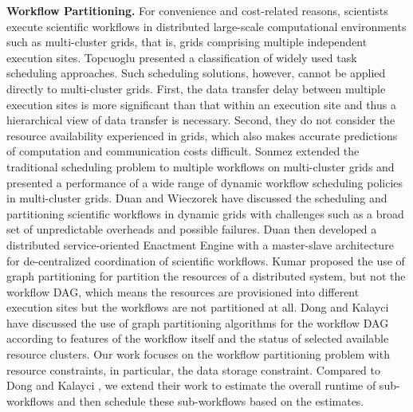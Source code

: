 \textbf{Workflow Partitioning.} For convenience and cost-related reasons, scientists execute scientific workflows \cite{Bharathi2008, Rubing2005} in distributed large-scale computational environments such as multi-cluster grids, that is, grids comprising multiple independent execution sites. Topcuoglu \cite{Topcuoglu2002} presented a classification of widely used task scheduling approaches. Such scheduling solutions, however, cannot be applied directly to multi-cluster grids. First, the data transfer delay between multiple execution sites is more significant than that within an execution site and thus a hierarchical view of data transfer is necessary. Second, they do not consider the resource availability experienced in grids, which also makes accurate predictions of computation and communication costs difficult. Sonmez \cite{Sonmez2010} extended the traditional scheduling problem to multiple workflows on multi-cluster grids and presented a performance of a wide range of dynamic workflow scheduling policies in multi-cluster grids. Duan \cite{Rubing2005} and Wieczorek \cite{Wieczorek2005} have discussed the scheduling and partitioning scientific workflows in dynamic grids with challenges such as a broad set of unpredictable overheads and possible failures. Duan \cite{Rubing2005} then developed a distributed service-oriented Enactment Engine with a master-slave architecture for de-centralized coordination of scientific workflows. Kumar \cite{Kumar2002} proposed the use of graph partitioning for partition the resources of a distributed system, but not the workflow DAG, which means the resources are provisioned into different execution sites but the workflows are not partitioned at all. Dong \cite{Dong2007} and Kalayci \cite{Kalayci2010} have discussed the use of graph partitioning algorithms for the workflow DAG according to features of the workflow itself and the status of selected available resource clusters. Our work focuses on the workflow partitioning problem with resource constraints, in particular, the data storage constraint. Compared to Dong \cite{Dong2007} and Kalayci \cite{Kalayci2010}, we extend their work to estimate the overall runtime of sub-workflows and then schedule these sub-workflows based on the estimates. 



